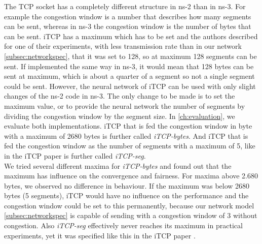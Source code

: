 The TCP socket has a completely different structure in ns-2 than in ns-3. 
For example the congestion window is a number that describes how many segments can be sent, whereas in ns-3 the congestion window is the number of bytes that can be sent.
iTCP has a maximum which has to be set and the authors described for one of their experiments, with less transmission rate than in our network \autoref{subsec:networkspec}, that it was set to 128, so at maximum 128 segments can be sent. 
If implemented the same way in ns-3, it would mean that 128 bytes can be sent at maximum, which is about a quarter of a segment so not a single segment could be sent. 
However, the neural network of iTCP can be used with only slight changes of the ns-2 code in ns-3. 
The only change to be made is to set the maximum value, or to provide the neural network the number of segments by dividing the congestion window by the segment size.
In \autoref{ch:evaluation}, we evaluate both implementations. iTCP that is fed the congestion window in byte with a maximum of 2680 bytes is further called \textit{iTCP-bytes}. And iTCP that is fed the congestion window as the number of segments with a maximum of 5, like in the iTCP paper is further called \textit{iTCP-seg}. \\
We tried several different maxima for \textit{iTCP-bytes} and found out that the maximum has influence on the convergence and fairness. For maxima above 2.680 bytes, we observed no difference in behaviour. If the maximum was below 2680 bytes (5 segments), iTCP would have no influence on the performance and the congestion window could be set to this permanently, because our network model \autoref{subsec:networkspec} is capable of sending with a congestion window of 3 without congestion. 
Also \textit{iTCP-seg} effectively never reaches its maximum in practical experiments, yet it was specified like this in the iTCP paper \cite{iTCP}.